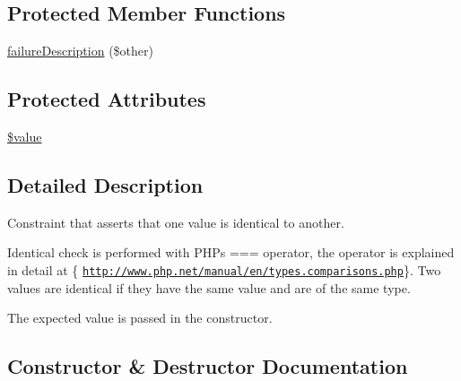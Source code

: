 \subsection*{Protected Member Functions}
\begin{DoxyCompactItemize}
\item 
\mbox{\hyperlink{class_p_h_p_unit___framework___constraint___is_identical_aaabb679273bfb812df4d81c283754a59}{failure\+Description}} (\$other)
\end{DoxyCompactItemize}
\subsection*{Protected Attributes}
\begin{DoxyCompactItemize}
\item 
\mbox{\hyperlink{class_p_h_p_unit___framework___constraint___is_identical_a0f298096f322952a72a50f98a74c7b60}{\$value}}
\end{DoxyCompactItemize}


\subsection{Detailed Description}
Constraint that asserts that one value is identical to another.

Identical check is performed with P\+HP\textquotesingle{}s === operator, the operator is explained in detail at \{ \href{http://www.php.net/manual/en/types.comparisons.php}{\tt http\+://www.\+php.\+net/manual/en/types.\+comparisons.\+php}\}. Two values are identical if they have the same value and are of the same type.

The expected value is passed in the constructor. 

\subsection{Constructor \& Destructor Documentation}
\mbox{\label{class_p_h_p_unit___framework___constraint___is_identical_a7e17a19b592345a03763f050fffe0ce7}} 
